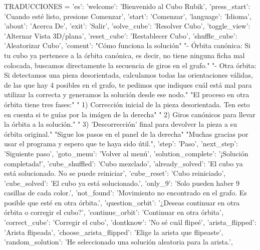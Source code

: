 TRADUCCIONES = {
    'es': {
        'welcome':         'Bienvenido al Cubo Rubik',
        'press_start':     'Cuando esté listo, presione Comenzar',
        'start':           'Comenzar',
        'language':        'Idioma',
        'about':           'Acerca De',
        'exit':            'Salir',
        'solve_cube':      'Resolver Cubo',
        'toggle_view':     'Alternar Vista 3D/plana',
        'reset_cube':      'Restablecer Cubo',
        'shuffle_cube':    'Aleatorizar Cubo',
        'coment':          "Cómo funciona la solución\n\n"
                            "- Órbita canónica: Si tu cubo ya pertenece a la órbita canónica, es decir, no tiene ninguna ficha mal colocada, buscamos directamente la secuencia de giros en el grafo.\n"
                            "- Otra órbita: Si detectamos una pieza desorientada, calculamos todas las orientaciones válidas, de las que hay 4 posibles en el grafo, te pedimos que indiques cuál está mal para utilizar la correcta y generamos la solución desde ese nodo.\n\n"
                            "El proceso en otra órbita tiene tres fases:\n"
                            "  1) Corrección inicial de la pieza desorientada. Ten esto en cuenta si te guías por la imágen de la derecha\n"
                            "  2) Giros canónicos para llevar la órbita a la solución.\n"
                            "  3) 'Descorrección' final para devolver la pieza a su órbita original.\n\n"
                            "Sigue los pasos en el panel de la derecha\n\n"
                            "Muchas gracias por usar el programa y espero que te haya sido útil.\n\n",
        'step':          'Paso',
        'next_step':       'Siguiente paso',
        'goto_menu':       'Volver al menú',
        'solution_complete': '¡Solución completada!',
        'cube_shuffled':   'Cubo mezclado',
        'already_solved':  'El cubo ya está solucionado. No se puede reiniciar',
        'cube_reset':      'Cubo reiniciado',
        'cube_solved':     'El cubo ya está solucionado.',
        'only_9':          'Solo pueden haber 9 casillas de cada color.',
        'not_found':       'Movimiento no encontrado en el grafo. Es posible que esté en otra órbita.',
        'question_orbit':  '¿Deseas continuar en otra órbita o corregir el cubo?',
        'continue_orbit':  'Continuar en otra órbita',
        'correct_cube':    'Corregir el cubo',
        'dontknow':        'No sé cuál flipeé',
        'arista_flipped':    'Arista flipeada',
        'choose_arista_flipped': 'Elige la arista que flipeaste',
        'random_solution': 'He seleccionado una solución aleatoria para la arista.',
}}
